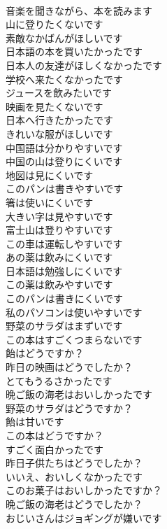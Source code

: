 \documentclass[8pt]{extreport}
\begin{document}
\begin{CJK}{UTF8}{min}
\\	音楽を聞きながら、本を読みます	
\\	山に登りたくないです	
\\	素敵なかばんがほしいです	
\\	日本語の本を買いたかったです	
\\	日本人の友達がほしくなかったです	
\\	学校へ来たくなかったです	
\\	ジュースを飲みたいです	
\\	映画を見たくないです	
\\	日本へ行きたかったです	
\\	きれいな服がほしいです	
\\	中国語は分かりやすいです	
\\	中国の山は登りにくいです	
\\	地図は見にくいです	
\\	このパンは書きやすいです	
\\	箸は使いにくいです	
\\	大きい字は見やすいです	
\\	富士山は登りやすいです	
\\	この車は運転しやすいです	
\\	あの薬は飲みにくいです	
\\	日本語は勉強しにくいです	
\\	この薬は飲みやすいです	
\\	このパンは書きにくいです	
\\	私のパソコンは使いやすいです	
\\	野菜のサラダはまずいです	
\\	この本はすごくつまらないです	
\\	飴はどうですか？	
\\	昨日の映画はどうでしたか？	
\\	とてもうるさかったです	
\\	晩ご飯の海老はおいしかったです	
\\	野菜のサラダはどうですか？	
\\	飴は甘いです	
\\	この本はどうですか？	
\\	すごく面白かったです	
\\	昨日子供たちはどうでしたか？	
\\	いいえ、おいしくなかったです	
\\	このお菓子はおいしかったですか？	
\\	晩ご飯の海老はどうでしたか？	
\\	おじいさんはジョギングが嫌いです	

\end{CJK}
\end{document}
